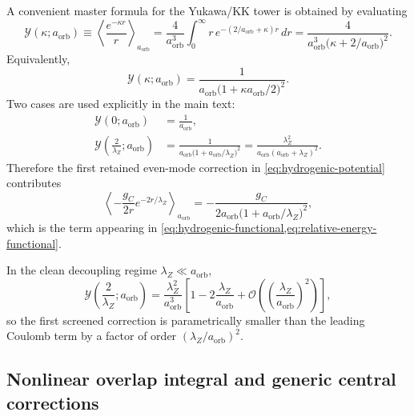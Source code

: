 \documentclass[11pt]{article}
\theoremstyle{plain}
\theoremstyle{definition}
\theoremstyle{remark}
\newcommand{\aorb}{a_{\mathrm{orb}}}
\newcommand{\Order}[1]{\mathcal{O}\!\left(#1\right)}
\begin{document}
A convenient master formula for the Yukawa/KK tower is obtained by evaluating
\begin{equation}
\mathcal Y(\kappa;\aorb)
\equiv
\left\langle \frac{e^{-\kappa r}}{r} \right\rangle_{\aorb}
=
\frac{4}{\aorb^3}\int_0^\infty r\,e^{-(2/\aorb+\kappa)r}\,dr
=
\frac{4}{\aorb^3\bigl(\kappa+2/\aorb\bigr)^2}.
\label{eq:appendix-master-yukawa}
\end{equation}
Equivalently,
\begin{equation}
\mathcal Y(\kappa;\aorb)
=
\frac{1}{\aorb\bigl(1+\kappa\aorb/2\bigr)^2}.
\label{eq:appendix-master-yukawa-compact}
\end{equation}
Two cases are used explicitly in the main text:
\begin{align}
\mathcal Y(0;\aorb)
&=
\frac{1}{\aorb},
\label{eq:appendix-yukawa-kappa-zero}
\\[0.5ex]
\mathcal Y\!\left(\frac{2}{\lambda_Z};\aorb\right)
&=
\frac{1}{\aorb\bigl(1+\aorb/\lambda_Z\bigr)^2}
=
\frac{\lambda_Z^2}{\aorb(\aorb+\lambda_Z)^2}.
\label{eq:appendix-yukawa-kappa-lambda}
\end{align}
Therefore the first retained even-mode correction in \cref{eq:hydrogenic-potential} contributes
\begin{equation}
\left\langle -\frac{g_C}{2r}e^{-2r/\lambda_Z} \right\rangle_{\aorb}
=
-\frac{g_C}{2\aorb\bigl(1+\aorb/\lambda_Z\bigr)^2},
\label{eq:appendix-first-yukawa-energy}
\end{equation}
which is the term appearing in \cref{eq:hydrogenic-functional,eq:relative-energy-functional}.

In the clean decoupling regime $\lambda_Z\ll \aorb$,
\begin{equation}
\mathcal Y\!\left(\frac{2}{\lambda_Z};\aorb\right)
=
\frac{\lambda_Z^2}{\aorb^3}
\left[1-2\frac{\lambda_Z}{\aorb}+\Order{\left(\frac{\lambda_Z}{\aorb}\right)^2}\right],
\label{eq:appendix-yukawa-asymptotic}
\end{equation}
so the first screened correction is parametrically smaller than the leading Coulomb term by a factor of order $(\lambda_Z/\aorb)^2$.

\subsection{Nonlinear overlap integral and generic central corrections}\label{subsec:hydrogenic-integral-nonlinear}
\end{document}
